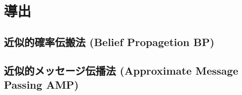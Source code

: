 \chapter{導出}
\section{近似的確率伝搬法 (Belief Propagetion BP)}
\section{近似的メッセージ伝播法 (Approximate Message Passing AMP)}
